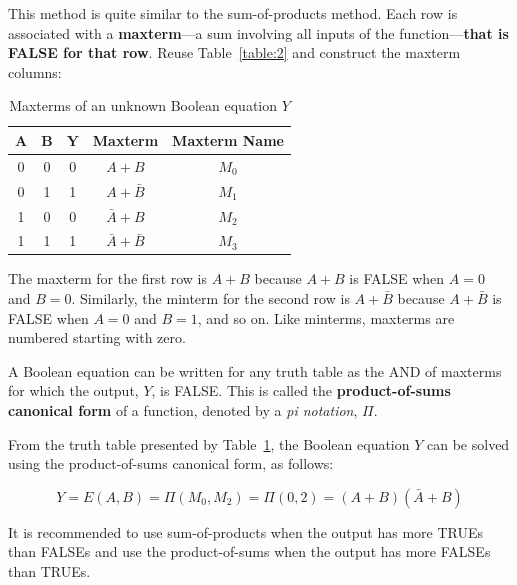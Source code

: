 \documentclass[12pt]{article}
\begin{document}
\begin{enumerate}
  This method is quite similar to the sum-of-products method. Each row is associated with a \textbf{maxterm}---a sum involving all inputs of the function---\textbf{that is FALSE for that row}. Reuse Table~\ref{table:2} and construct the maxterm columns:

  \begin{table}[h]
    \centering
    \begin{tabular}{ | c | c | c | c | c | }
    \hline \rule{0em}{1em}
    $\mathbf{A}$ & $\mathbf{B}$ & $\mathbf{Y}$ & \textbf{Maxterm}    & \textbf{Maxterm Name} \\ \hline \rule{0em}{1em}
    0            & 0            & 0            & $A + B$             & $M_0$                 \\ \hline \rule{0em}{1em}
    0            & 1            & 1            & $A + \bar{B}$       & $M_1$                 \\ \hline \rule{0em}{1em}
    1            & 0            & 0            & $\bar{A} + B$       & $M_2$                 \\ \hline \rule{0em}{1em}
    1            & 1            & 1            & $\bar{A} + \bar{B}$ & $M_3$                 \\ \hline
    \end{tabular}
    \caption{Maxterms of an unknown Boolean equation $Y$}
    \label{table:3}
  \end{table}

  The maxterm for the first row is $A + B$ because $A + B$ is FALSE when $A = 0$ and $B = 0$. Similarly, the minterm for the second row is $A + \bar{B}$ because $A + \bar{B}$ is FALSE when $A = 0$ and $B = 1$, and so on. Like minterms, maxterms are numbered starting with zero.

  A Boolean equation can be written for any truth table as the AND of maxterms for which the output, $Y$, is FALSE. This is called the \textbf{product-of-sums canonical form} of a function, denoted by a \textit{pi notation}, $\Pi$.

  From the truth table presented by Table~\ref{table:3}, the Boolean equation $Y$ can be solved using the product-of-sums canonical form, as follows:

  \begin{equation} \label{equation:4}
    Y = E(A, B) = \Pi(M_0, M_2) = \Pi(0, 2) = (A + B)(\bar{A} + B)
  \end{equation}

  It is recommended to use sum-of-products when the output has more TRUEs than FALSEs and use the product-of-sums when the output has more FALSEs than TRUEs.
\end{enumerate}
\end{document}
